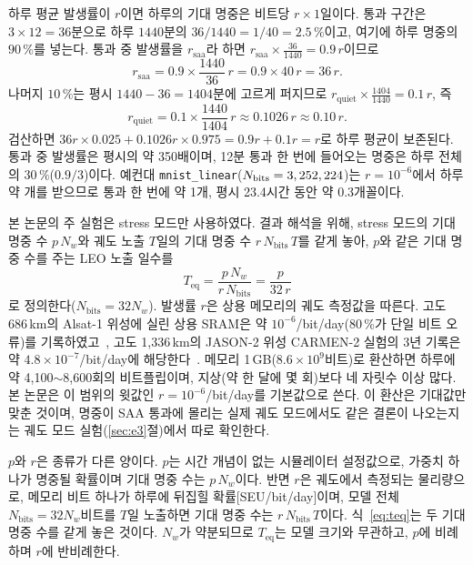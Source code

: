 \documentclass[11pt,a4paper]{article}
\newcommand{\code}[1]{\texttt{#1}}
\newcounter{note}
\begin{document}
\begin{note}
\label{note:saa}
하루 평균 발생률이 $r$이면 하루의 기대 명중은 비트당 $r\times1$일이다. 통과 구간은 $3\times12=36$분으로 하루 $1440$분의 $36/1440=1/40=2.5\,\%$이고, 여기에 하루 명중의 $90\,\%$를 넣는다. 통과 중 발생률을 $r_{\mathrm{saa}}$라 하면 $r_{\mathrm{saa}}\times\tfrac{36}{1440}=0.9\,r$이므로
\[
  r_{\mathrm{saa}} = 0.9\times\frac{1440}{36}\,r = 0.9\times40\,r = 36\,r .
\]
나머지 $10\,\%$는 평시 $1440-36=1404$분에 고르게 퍼지므로 $r_{\mathrm{quiet}}\times\tfrac{1404}{1440}=0.1\,r$, 즉
\[
  r_{\mathrm{quiet}} = 0.1\times\frac{1440}{1404}\,r \approx 0.1026\,r \approx 0.10\,r .
\]
검산하면 $36r\times0.025+0.1026r\times0.975=0.9r+0.1r=r$로 하루 평균이 보존된다. 통과 중 발생률은 평시의 약 350배이며, 12분 통과 한 번에 들어오는 명중은 하루 전체의 $30\,\%$($0.9/3$)이다. 예컨대 \code{mnist\_linear}($N_{\mathrm{bits}}=3,252,224{}$)는 $r=10^{-6}$에서 하루 약 \LeoFlipsPerDay{}개를 받으므로 통과 한 번에 약 1개, 평시 23.4시간 동안 약 0.3개꼴이다.
\end{note}
본 논문의 주 실험은 stress 모드만 사용하였다. 결과 해석을 위해, stress 모드의 기대 명중 수 $p\,N_w$와 궤도 노출 $T$일의 기대 명중 수 $r\,N_{\mathrm{bits}}\,T$를 같게 놓아, $p$와 같은 기대 명중 수를 주는 LEO 노출 일수를
\begin{equation}
  T_{\mathrm{eq}} = \frac{p\,N_w}{r\,N_{\mathrm{bits}}} = \frac{p}{32\,r}
  \label{eq:teq}
\end{equation}
로 정의한다($N_{\mathrm{bits}}=32N_w$). 발생률 $r$은 상용 메모리의 궤도 측정값을 따른다. 고도 686\,km의 Alsat-1 위성에 실린 상용 SRAM은 약 $10^{-6}$/bit/day(80\,\%가 단일 비트 오류)를 기록하였고~\citep{bentoutou2008}, 고도 1{,}336\,km의 JASON-2 위성 CARMEN-2 실험의 3년 기록은 약 $4.8\times10^{-7}$/bit/day에 해당한다~\citep{samaras2015,wang2024}. 메모리 1\,GB($8.6\times10^{9}$비트)로 환산하면 하루에 약 4{,}100$\sim$8{,}600회의 비트플립이며, 지상(약 한 달에 몇 회)보다 네 자릿수 이상 많다. 본 논문은 이 범위의 윗값인 $r=10^{-6}$/bit/day를 기본값으로 쓴다. 이 환산은 기대값만 맞춘 것이며, 명중이 SAA 통과에 몰리는 실제 궤도 모드에서도 같은 결론이 나오는지는 궤도 모드 실험(\ref{sec:e3}절)에서 따로 확인한다.

\begin{note}[$p$와 $r$의 차이]
$p$와 $r$은 종류가 다른 양이다. $p$는 시간 개념이 없는 시뮬레이터 설정값으로, 가중치 하나가 명중될 확률이며 기대 명중 수는 $p\,N_w$이다. 반면 $r$은 궤도에서 측정되는 물리량으로, 메모리 비트 하나가 하루에 뒤집힐 확률[SEU/bit/day]이며, 모델 전체 $N_{\mathrm{bits}}=32N_w$비트를 $T$일 노출하면 기대 명중 수는 $r\,N_{\mathrm{bits}}\,T$이다. 식~\eqref{eq:teq}는 두 기대 명중 수를 같게 놓은 것이다. $N_w$가 약분되므로 $T_{\mathrm{eq}}$는 모델 크기와 무관하고, $p$에 비례하며 $r$에 반비례한다.
\end{note}
\end{document}
